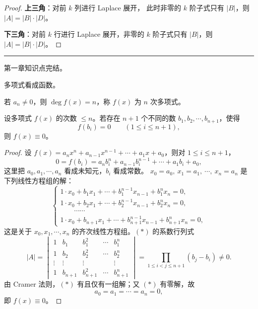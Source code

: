 \begin{proof}
\textbf{上三角}：对前 $k$ 列进行 Laplace 展开，
此时非零的 $k$ 阶子式只有 $|B|$，则 $|A|=|B|\cdot|D|$。

\textbf{下三角}：对前 $k$ 行进行 Laplace 展开，非零的 $k$ 阶子式只有 $|B|$，则 $|A|=|B|\cdot|D|$。
\end{proof}

\vspace{0.5em}
\noindent\rule{\linewidth}{0.5pt}
\begin{flushright}
\footnotesize 第一章知识点完结。
\end{flushright}

\begin{center}
\end{center}
多项式看成函数。

若 $a_n\ne 0$，则 $\deg f(x)=n$，称 $f(x)$ 为 $n$ 次多项式。

\begin{proposition}
设多项式 $f(x)$ 的次数 $\le n$。若存在 $n+1$ 个不同的数 $b_1,b_2,\cdots,b_{n+1}$，使得
\[
f(b_i)=0\qquad(1\le i\le n+1),
\]
则 $f(x)\equiv 0$。
\end{proposition}

\begin{proof}
设 $f(x)=a_nx^n+a_{n-1}x^{n-1}+\cdots+a_1x+a_0$，则对 $1\le i\le n+1$，
\[
0=f(b_i)=a_nb_i^n+a_{n-1}b_i^{n-1}+\cdots+a_1b_i+a_0,
\]
这里把 $a_0,a_1,\cdots,a_n$ 看成未知元，$b_i$ 看成常数。
$x_0=a_0,\ x_1=a_1,\ \cdots,\ x_n=a_n$ 是下列线性方程组的解：
\begin{equation}
\begin{cases}
1\cdot x_0+b_1x_1+\cdots+b_1^{n-1}x_{n-1}+b_1^nx_n=0,\\
1\cdot x_0+b_2x_1+\cdots+b_2^{n-1}x_{n-1}+b_2^nx_n=0,\\
\qquad\cdots\cdots\\
1\cdot x_0+b_{n+1}x_1+\cdots+b_{n+1}^{n-1}x_{n-1}+b_{n+1}^nx_n=0,
\end{cases}
\tag{$*$}
\end{equation}
这是关于 $x_0,x_1,\cdots,x_n$ 的齐次线性方程组。$(*)$ 的系数行列式
\[
|A|=\begin{vmatrix}
1 & b_1 & b_1^2 & \cdots & b_1^n\\
1 & b_2 & b_2^2 & \cdots & b_2^n\\
\vdots & \vdots & \vdots & & \vdots\\
1 & b_{n+1} & b_{n+1}^2 & \cdots & b_{n+1}^n
\end{vmatrix}
=\prod_{1\le i<j\le n+1}(b_j-b_i)\ne 0.
\]
由 Cramer 法则，$(*)$ 有且仅有一组解；又 $(*)$ 有零解，故
\[
a_0=a_1=\cdots=a_n=0,
\]
即 $f(x)\equiv 0$。
\end{proof}

